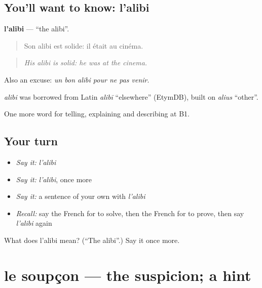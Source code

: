\subsection*{You'll want to know: l'alibi}
\textbf{l'alibi} — \textquotedblleft{}the alibi\textquotedblright{}.

\begin{quote}
Son alibi est solide: il était au cinéma.
\end{quote}

\begin{quote}
\emph{His alibi is solid: he was at the cinema.}
\end{quote}

Also an excuse: \emph{un bon alibi pour ne pas venir}.

\begin{cousinweb}
\emph{alibi} was borrowed from Latin \emph{alibī} \textquotedblleft{}elsewhere\textquotedblright{} (EtymDB), built on \emph{alius} \textquotedblleft{}other\textquotedblright{}.
\end{cousinweb}

\begin{grammarlens}[title={What you've built}]
One more word for telling, explaining and describing at B1.
\end{grammarlens}

\subsection*{Your turn}
\begin{itemize}
\raggedright
  \item \emph{Say it:} \emph{l'alibi}
  \item \emph{Say it:} \emph{l'alibi}, once more
  \item \emph{Say it:} a sentence of your own with \emph{l'alibi}
  \item \emph{Recall:} say the French for to solve, then the French for to prove, then say \emph{l'alibi} again
\end{itemize}

\begin{tcolorbox}[breakable,colback=teal!4,colframe=teal!35!black,title={Before you move on}]
What does l'alibi mean? (\textquotedblleft{}The alibi\textquotedblright{}.) Say it once more.
\end{tcolorbox}
\section[le soupçon]{le soupçon — the suspicion; a hint}

